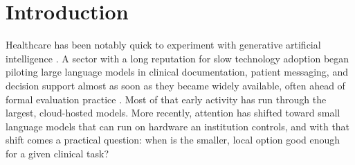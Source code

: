 \documentclass[11pt]{article}
\begin{document}
\begin{abstract}
\textbf{Conclusions:}
FIT-SLM-HC acts as a first-pass triage tool that gives healthcare organizations a structured procedure for helping determine when to default to local SLMs versus cloud-based LLMs via explicit metric selection, reference-model selection, and threshold selection. The framework is designed to be re-run as models change rather than once, thus rapid model turnover due to improvements strengthens rather than weakens the case for this approach. Blinded multi-annotator validation of the task rubric and prospective evaluation are necessary but not yet performed.
\end{abstract}

\section{Introduction}
\label{sec:intro}

Healthcare has been notably quick to experiment with generative artificial intelligence \cite{Su2025, Mesko2023}. A sector with a long reputation for slow technology adoption began piloting large language models in clinical documentation, patient messaging, and decision support almost as soon as they became widely available, often ahead of formal evaluation practice \cite{Shah2023}. Most of that early activity has run through the largest, cloud-hosted models. More recently, attention has shifted toward small language models that can run on hardware an institution controls, and with that shift comes a practical question: when is the smaller, local option good enough for a given clinical task?
\end{document}
